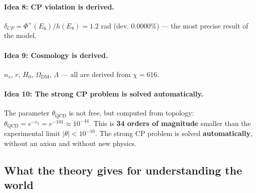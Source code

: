 \documentclass[11pt,a4paper]{article}
\theoremstyle{definition}
\begin{document}
\paragraph{Idea 8: CP violation is derived.}
$\delta_{CP} = \Phi^+(E_6)/h(E_8) = 1.2$ rad (dev. 
$\mathbf{0.0000\%}$) — the most precise result of the model.

\paragraph{Idea 9: Cosmology is derived.}
$n_s$, $r$, $H_0$, $\Omega_{\text{DM}}$, $\Lambda$ — all 
are derived from $\chi = 616$.

\paragraph{Idea 10: The strong CP problem is solved automatically.}
The parameter $\theta_{\text{QCD}}$ is not free, but computed from
topology: $\theta_{\text{QCD}} = e^{-c_2} = e^{-101} \approx 10^{-44}$.
This is \textbf{34 orders of magnitude} smaller than the experimental limit
$|\theta| < 10^{-10}$. The strong CP problem is solved
\textbf{automatically}, without an axion and without new physics.
  
\subsection{What the theory gives for understanding the world}
\label{subsec:conclusions-what-gives}
\end{document}
